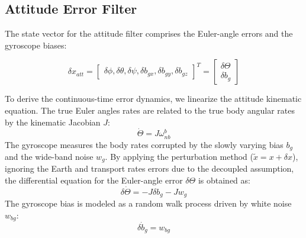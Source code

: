 \documentclass[a4paper,twoside,openany]{report}
\begin{document}
\subsection{Attitude Error Filter}

The state vector for the attitude filter comprises the Euler-angle errors and the gyroscope biases:

\begin{equation}
    \delta x_{att} = \begin{bmatrix} \delta\phi, \delta\theta, \delta\psi, \delta b_{gx}, \delta b_{gy}, \delta b_{gz} \end{bmatrix}^T = \begin{bmatrix} \delta\Theta \\ \delta b_g \end{bmatrix}
\end{equation}

To derive the continuous-time error dynamics, we linearize the attitude kinematic equation. The true Euler angles rates are related to the true body angular rates by the kinematic Jacobian $J$:
\begin{equation}
    \dot{\Theta} = J \omega_{nb}^b
\end{equation}
The gyroscope measures the body rates corrupted by the slowly varying bias $b_g$ and the wide-band noise $w_g$. By applying the perturbation method ($\tilde{x} = x + \delta x$), ignoring the Earth and transport rates errors due to the decoupled assumption, the differential equation for the Euler-angle error $\delta\Theta$ is obtained as:
\begin{equation}
    \delta\dot{\Theta} = -J \delta b_g - J w_g
\end{equation}
The gyroscope bias is modeled as a random walk process driven by white noise $w_{bg}$:
\begin{equation}
    \delta\dot{b}_g = w_{bg}
\end{equation}
\end{document}
